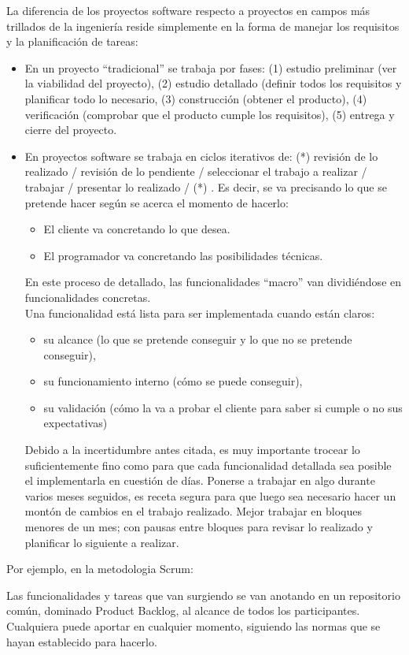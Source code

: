 \documentclass[spanish,12pt,a4paper,final,oneside]{book}
\begin{document}
La diferencia de los proyectos software respecto a proyectos en campos más trillados de la ingeniería reside simplemente en la forma de manejar los requisitos y la planificación de tareas:
\begin{itemize}
\item En un proyecto ``tradicional'' se trabaja por fases: (1) estudio preliminar (ver la viabilidad del proyecto), (2) estudio detallado (definir todos los requisitos y planificar todo lo necesario, (3) construcción (obtener el producto), (4) verificación (comprobar que el producto cumple los requisitos), (5) entrega y cierre del proyecto.
\item En proyectos software se trabaja en ciclos iterativos de: (*) revisión de lo realizado / revisión de lo pendiente / seleccionar el trabajo a realizar / trabajar / presentar lo realizado / (*) . Es decir, se va precisando lo que se pretende hacer según se acerca el momento de hacerlo:
\begin{itemize}
\item El cliente va concretando lo que desea.
\item El programador va concretando las posibilidades técnicas.
\end{itemize}
En este proceso de detallado, las funcionalidades ``macro'' van dividiéndose en funcionalidades concretas.
\\Una funcionalidad está lista para ser implementada cuando están claros:
\begin{itemize}
\item su alcance (lo que se pretende conseguir y lo que no se pretende conseguir), 
\item su funcionamiento interno (cómo se puede conseguir),
\item su validación (cómo la va a probar el cliente para saber si cumple o no sus expectativas)
\end{itemize} 
Debido a la incertidumbre antes citada, es muy importante trocear lo suficientemente fino como para que cada funcionalidad detallada sea posible el implementarla en cuestión de días. Ponerse a trabajar en algo durante varios meses seguidos, es receta segura para que luego sea necesario hacer un montón de cambios en el trabajo realizado. Mejor trabajar en bloques menores de un mes; con pausas entre bloques para revisar lo realizado y planificar lo siguiente a realizar.
\end{itemize}

Por ejemplo, en la metodologia Scrum:

Las funcionalidades y tareas que van surgiendo se van anotando en un repositorio común, dominado Product Backlog, al alcance de todos los participantes. Cualquiera puede aportar en cualquier momento, siguiendo las normas que se hayan establecido para hacerlo.
\end{document}
